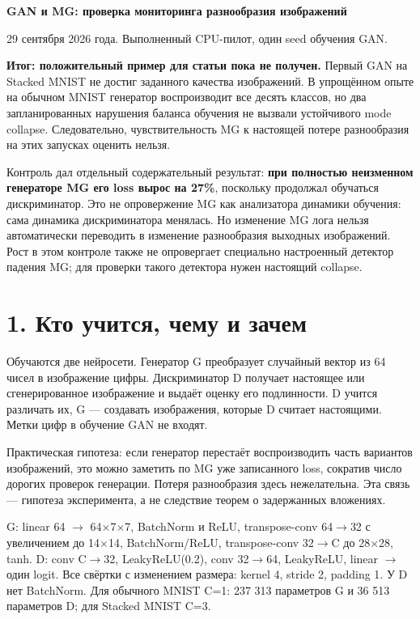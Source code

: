 \documentclass[10pt,a4paper]{article}
\begin{document}
{\Large\bfseries GAN и MG: проверка мониторинга разнообразия изображений}\par\medskip

29 сентября 2026 года. Выполненный CPU-пилот, один seed обучения GAN.

\textbf{Итог: положительный пример для статьи пока не получен.} Первый GAN на Stacked MNIST не достиг заданного качества изображений. В упрощённом опыте на обычном MNIST генератор воспроизводит все десять классов, но два запланированных нарушения баланса обучения не вызвали устойчивого mode collapse. Следовательно, чувствительность MG к настоящей потере разнообразия на этих запусках оценить нельзя.

Контроль дал отдельный содержательный результат: \textbf{при полностью неизменном генераторе MG его loss вырос на 27\%}, поскольку продолжал обучаться дискриминатор. Это не опровержение MG как анализатора динамики обучения: сама динамика дискриминатора менялась. Но изменение MG лога нельзя автоматически переводить в изменение разнообразия выходных изображений. Рост в этом контроле также не опровергает специально настроенный детектор падения MG; для проверки такого детектора нужен настоящий collapse.

\section*{1. Кто учится, чему и зачем}

Обучаются две нейросети. Генератор G преобразует случайный вектор из 64 чисел в изображение цифры. Дискриминатор D получает настоящее или сгенерированное изображение и выдаёт оценку его подлинности. D учится различать их, G --- создавать изображения, которые D считает настоящими. Метки цифр в обучение GAN не входят.

Практическая гипотеза: если генератор перестаёт воспроизводить часть вариантов изображений, это можно заметить по MG уже записанного loss, сократив число дорогих проверок генерации. Потеря разнообразия здесь нежелательна. Эта связь --- гипотеза эксперимента, а не следствие теорем о задержанных вложениях.

G: linear 64 \ensuremath{\to} 64\ensuremath{\times}7\ensuremath{\times}7, BatchNorm и ReLU, transpose-conv 64\ensuremath{\to}32 с увеличением до 14\ensuremath{\times}14, BatchNorm/ReLU, transpose-conv 32\ensuremath{\to}C до 28\ensuremath{\times}28, tanh. D: conv C\ensuremath{\to}32, LeakyReLU(0.2), conv 32\ensuremath{\to}64, LeakyReLU, linear \ensuremath{\to} один logit. Все свёртки с изменением размера: kernel 4, stride 2, padding 1. У D нет BatchNorm. Для обычного MNIST C=1: 237 313 параметров G и 36 513 параметров D; для Stacked MNIST C=3.
\end{document}
